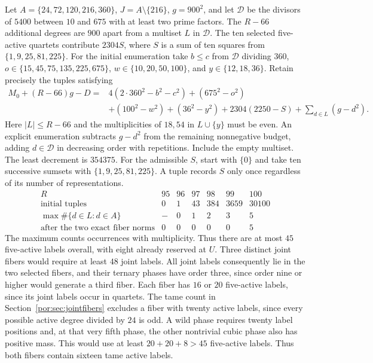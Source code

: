 \documentclass[11pt,a4paper]{article}
\numberwithin{equation}{section}
\theoremstyle{remark}
\begin{document}
Let $A=\{24,72,120,216,360\}$, $J=A\setminus\{216\}$, $g=900^2$, and let $\mathcal D$ be the divisors of $5400$ between $10$ and $675$ with at least two prime factors. The $R-66$ additional degrees are $900$ apart from a multiset $L$ in $\mathcal D$. The ten selected five-active quartets contribute $2304S$, where $S$ is a sum of ten squares from $\{1,9,25,81,225\}$. For the initial enumeration take $b\le c$ from $\mathcal D$ dividing $360$, $o\in\{15,45,75,135,225,675\}$, $w\in\{10,20,50,100\}$, and $y\in\{12,18,36\}$. Retain precisely the tuples satisfying
\begin{align*}
 M_0+(R-66)g-D={}&4(2\cdot360^2-b^2-c^2)+(675^2-o^2)\\
 &+(100^2-w^2)+(36^2-y^2)+2304(2250-S)
                   +\sum_{d\in L}(g-d^2).
\end{align*}
Here $|L|\le R-66$ and the multiplicities of $18,54$ in $L\cup\{y\}$ must be even. An explicit enumeration subtracts $g-d^2$ from the remaining nonnegative budget, adding $d\in\mathcal D$ in decreasing order with repetitions. Include the empty multiset. The least decrement is $354375$. For the admissible $S$, start with $\{0\}$ and take ten successive sumsets with $\{1,9,25,81,225\}$. A tuple records $S$ only once regardless of its number of representations.
\[
\begin{array}{c|rrrrrr}
R&95&96&97&98&99&100\\\hline
\text{initial tuples}&0&1&43&384&3659&30100\\
\max\#\{d\in L:d\in A\}&-&0&1&2&3&5\\
\text{after the two exact fiber norms}&0&0&0&0&0&5
\end{array}
\]
The maximum counts occurrences with multiplicity. Thus there are at most $45$ five-active labels overall, with eight already reserved at $U$. Three distinct joint fibers would require at least $48$ joint labels. All joint labels consequently lie in the two selected fibers, and their ternary phases have order three, since order nine or higher would generate a third fiber. Each fiber has $16$ or $20$ five-active labels, since its joint labels occur in quartets. The tame count in Section~\ref{por:sec:jointfibers} excludes a fiber with twenty active labels, since every possible active degree divided by $24$ is odd. A wild phase requires twenty label positions and, at that very fifth phase, the other nontrivial cubic phase also has positive mass. This would use at least $20+20+8>45$ five-active labels. Thus both fibers contain sixteen tame active labels.
\end{document}
